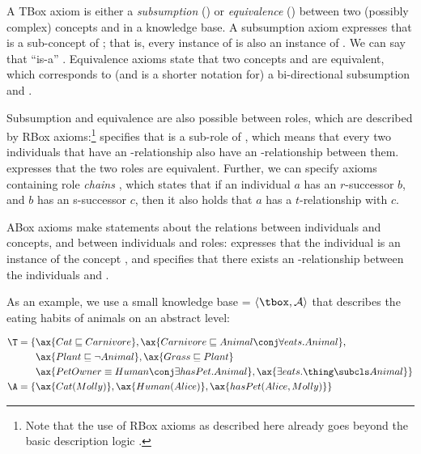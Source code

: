 A TBox axiom \axiom is either a \emph{subsumption} () or \emph{equivalence} () between two (possibly complex) concepts  and  in a knowledge base. A subsumption axiom expresses that  is a sub-concept of ; that is, every instance of  is also an instance of . We can say that  \enquote{is-a} . Equivalence axioms state that two concepts  and  are equivalent, which corresponds to (and is a shorter notation for) a bi-directional subsumption  and .

Subsumption and equivalence are also possible between roles, which are described by RBox axioms:\footnote{Note that the use of RBox axioms as described here already goes beyond the basic description logic .}  specifies that  is a sub-role of , which means that every two individuals that have an -relationship also have an -relationship between them.  expresses that the two roles are equivalent. Further, we can specify axioms containing role \emph{chains} , which states that if an individual $a$ has an $r$-successor $b$, and $b$ has an s-successor $c$, then it also holds that $a$ has a $t$-relationship with $c$.

ABox axioms make statements about the relations between individuals and concepts, and between individuals and roles:  expresses that the individual  is an instance of the concept , and  specifies that there exists an -relationship between the individuals  and .

As an example, we use a small knowledge base \K = $\langle \tbox, \mathcal{A}\rangle$ that describes the eating habits of animals on an abstract level:
\begin{examp}
\begin{align*}
		\T = \{&\ax{Cat \sqsubseteq Carnivore}, \ax{Carnivore \sqsubseteq Animal \conj \forall eats.Animal},\\ 
		& \ax{Plant \sqsubseteq \lnot Animal}, \ax{Grass \sqsubseteq Plant} \\ 
		& \ax{PetOwner \equiv Human\conj \exists hasPet.Animal}, \ax{\exists eats.\thing \subcls Animal}\}\\
		\A = \{& \ax{Cat(Molly)},\ax{Human(Alice)},\ax{hasPet(Alice, Molly)}\}\label{ex:petkb}
	\end{align*}
\end{examp}

